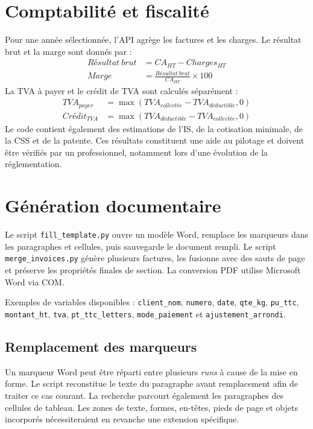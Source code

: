 \documentclass[12pt,a4paper,oneside]{report}
\newcommand{\code}[1]{\texttt{#1}}
\begin{document}
\section{Comptabilité et fiscalité}
Pour une année sélectionnée, l'API agrège les factures et les charges. Le résultat brut et la marge sont donnés par :
\begin{align}
Résultat\ brut &= CA_{HT} - Charges_{HT} \\
Marge &= \frac{Résultat\ brut}{CA_{HT}} \times 100
\end{align}
La TVA à payer et le crédit de TVA sont calculés séparément :
\begin{align}
TVA_{payer} &= \max(TVA_{collectée}-TVA_{déductible},0)\\
Crédit_{TVA} &= \max(TVA_{déductible}-TVA_{collectée},0)
\end{align}
Le code contient également des estimations de l'IS, de la cotisation minimale, de la CSS et de la patente. Ces résultats constituent une aide au pilotage et doivent être vérifiés par un professionnel, notamment lors d'une évolution de la réglementation.

\section{Génération documentaire}
Le script \code{fill\_template.py} ouvre un modèle Word, remplace les marqueurs dans les paragraphes et cellules, puis sauvegarde le document rempli. Le script \code{merge\_invoices.py} génère plusieurs factures, les fusionne avec des sauts de page et préserve les propriétés finales de section. La conversion PDF utilise Microsoft Word via COM.

Exemples de variables disponibles : \code{client\_nom}, \code{numero}, \code{date}, \code{qte\_kg}, \code{pu\_ttc}, \code{montant\_ht}, \code{tva}, \code{pt\_ttc\_letters}, \code{mode\_paiement} et \code{ajustement\_arrondi}.

\subsection{Remplacement des marqueurs}
Un marqueur Word peut être réparti entre plusieurs \emph{runs} à cause de la mise en forme. Le script reconstitue le texte du paragraphe avant remplacement afin de traiter ce cas courant. La recherche parcourt également les paragraphes des cellules de tableau. Les zones de texte, formes, en-têtes, pieds de page et objets incorporés nécessiteraient en revanche une extension spécifique.
\end{document}
